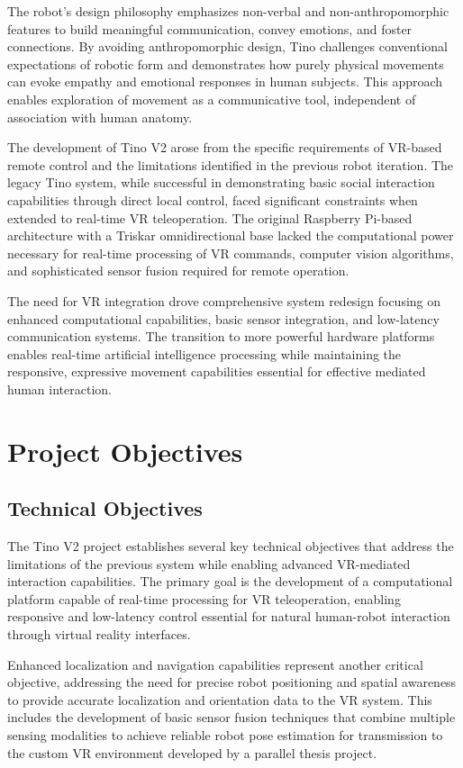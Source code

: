 The robot's design philosophy emphasizes non-verbal and non-anthropomorphic features to build meaningful communication, convey emotions, and foster connections. By avoiding anthropomorphic design, Tino challenges conventional expectations of robotic form and demonstrates how purely physical movements can evoke empathy and emotional responses in human subjects. This approach enables exploration of movement as a communicative tool, independent of association with human anatomy.

The development of Tino V2 arose from the specific requirements of VR-based remote control and the limitations identified in the previous robot iteration. The legacy Tino system, while successful in demonstrating basic social interaction capabilities through direct local control, faced significant constraints when extended to real-time VR teleoperation. The original Raspberry Pi-based architecture with a Triskar omnidirectional base lacked the computational power necessary for real-time processing of VR commands, computer vision algorithms, and sophisticated sensor fusion required for remote operation.

The need for VR integration drove comprehensive system redesign focusing on enhanced computational capabilities, basic sensor integration, and low-latency communication systems. The transition to more powerful hardware platforms enables real-time artificial intelligence processing while maintaining the responsive, expressive movement capabilities essential for effective mediated human interaction.

\section{Project Objectives}

\subsection{Technical Objectives}
The Tino V2 project establishes several key technical objectives that address the limitations of the previous system while enabling advanced VR-mediated interaction capabilities. The primary goal is the development of a computational platform capable of real-time processing for VR teleoperation, enabling responsive and low-latency control essential for natural human-robot interaction through virtual reality interfaces.

Enhanced localization and navigation capabilities represent another critical objective, addressing the need for precise robot positioning and spatial awareness to provide accurate localization and orientation data to the VR system. This includes the development of basic sensor fusion techniques that combine multiple sensing modalities to achieve reliable robot pose estimation for transmission to the custom VR environment developed by a parallel thesis project.

